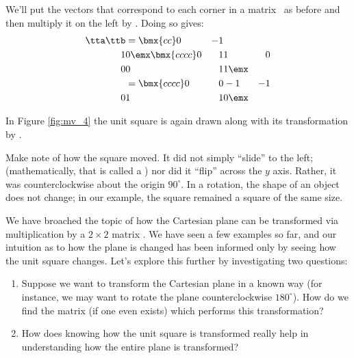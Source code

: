 {We'll put the vectors that correspond to each corner in a matrix \ttb\ as before and then multiply it on the left by \tta. Doing so gives:
\begin{align*}
\tta\ttb &= \bmx{cc}0&-1\\1&0\emx \bmx{cccc}0&1&1&0\\0&0&1&1\emx\\
				& = \bmx{cccc}0 & 0&-1&-1\\0&1&1&0\emx
\end{align*}

In Figure \ref{fig:mv_4} the unit square is again drawn along with its transformation by \tta.

\begin{myfigure}
\begin{center}
\end{center}
\label{fig:mv_4}
\end{myfigure}

Make note of how the square moved. It did not simply ``slide'' to the left; (mathematically, that is called a ) nor did it ``flip'' across the $y$ axis. Rather, it was  counterclockwise about the origin $90^\circ$. In a rotation, the shape of an object does not change; in our example, the square remained a square of the same size.
}

\medskip

We have broached the topic of how the Cartesian plane can be transformed via multiplication by a $2\times 2$ matrix \tta. We have seen a few examples so far, and our intuition as to how the plane is changed has been informed only by seeing how the unit square changes. Let's explore this further by investigating two questions:
	\begin{enumerate}
	\item		Suppose we want to transform the Cartesian plane in a known way (for instance, we may want to rotate the plane counterclockwise $180^\circ$). How do we find the matrix (if one even exists) which performs this transformation? 
	\item		How does knowing how the unit square is transformed really help in understanding how the entire plane is transformed?
	\end{enumerate}

